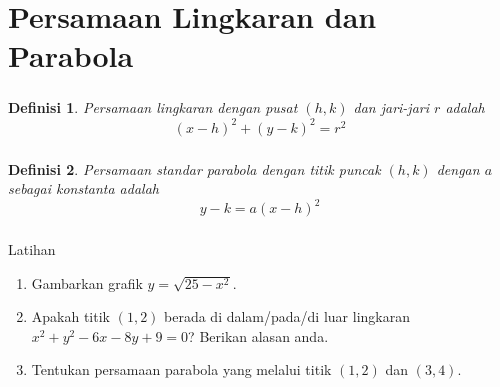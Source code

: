 \documentclass[aspectratio=169]{beamer}
\newtheorem{definisi}{Definisi}
\theoremstyle{definition}
\begin{document}
    \section{Persamaan Lingkaran dan Parabola}
    \begin{frame}
        \frametitle{\insertsection}
        \begin{definisi}
            Persamaan lingkaran dengan pusat $(h,k)$ dan jari-jari $r$ adalah
            \[(x-h)^2+(y-k)^2=r^2\]
        \end{definisi}
        \begin{center}
        \end{center}
    \end{frame}

    \begin{frame}
        \frametitle{\insertsection}
        \begin{definisi}
            Persamaan standar parabola dengan titik puncak $(h,k)$ dengan $a$ sebagai konstanta adalah
            \[y-k=a(x-h)^2\]
        \end{definisi}
        \begin{center}
        \end{center}
    \end{frame}

    \begin{frame}
        \frametitle{\insertsection}
        \begin{exampleblock}{Latihan}
            \begin{enumerate}[label=(\arabic*)]
                \item Gambarkan grafik $y=\sqrt{25-x^2}$.
                \item Apakah titik $(1,2)$ berada di dalam/pada/di luar lingkaran $x^2+y^2-6x-8y+9=0$? Berikan alasan anda.
                \item Tentukan persamaan parabola yang melalui titik $(1,2)$ dan $(3,4)$.
            \end{enumerate}
        \end{exampleblock}
    \end{frame}
\end{document}
